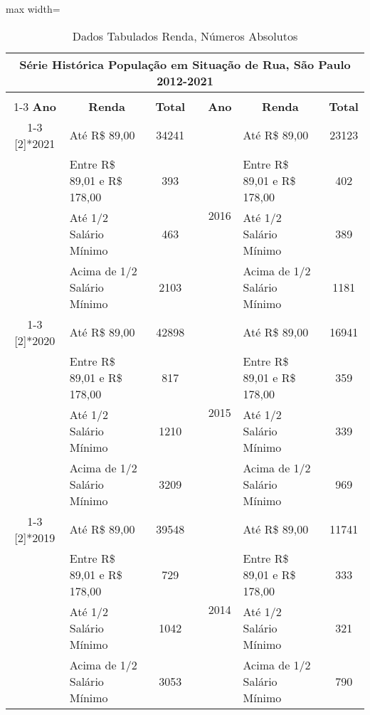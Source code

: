 \documentclass[14pt]{extarticle}
\begin{document}
\begin{table}[htbp]
  \centering
  \caption{Dados Tabulados Renda, Números Absolutos}
  \tabcolsep=0.15cm
	\renewcommand{\arraystretch}{1.8}
	\begin{adjustbox}{max width=\linewidth}
    \begin{tabular}{clccclc}
    \toprule
    \multicolumn{7}{c}{Série Histórica População em Situação de Rua, São Paulo 2012-2021} \\
    \midrule
         &      &      &      &      &      &  \\
\cmidrule{1-3}\cmidrule{5-7}    \rowcolor[rgb]{ .906,  .902,  .902} \textbf{Ano} & \multicolumn{1}{c}{\textbf{Renda}} & \multicolumn{1}{c}{\textbf{Total}} & \cellcolor[rgb]{ 1,  1,  1} & \textbf{Ano} & \multicolumn{1}{c}{\textbf{Renda}} & \multicolumn{1}{c}{\textbf{Total}} \\
\cmidrule{1-3}\cmidrule{5-7}    \multirow{4}[2]{*}{2021} & Até R\$ 89,00 & 34241 &      & \multirow{4}[2]{*}{2016} & Até R\$ 89,00 & 23123 \\
         & Entre R\$ 89,01 e R\$ 178,00 & 393  &      &      & Entre R\$ 89,01 e R\$ 178,00 & 402 \\
         & Até 1/2 Salário Mínimo & 463  &      &      & Até 1/2 Salário Mínimo & 389 \\
         & Acima de 1/2 Salário Mínimo & 2103 &      &      & Acima de 1/2 Salário Mínimo & 1181 \\
\cmidrule{1-3}\cmidrule{5-7}    \multirow{4}[2]{*}{2020} & Até R\$ 89,00 & 42898 &      & \multirow{4}[2]{*}{2015} & Até R\$ 89,00 & 16941 \\
         & Entre R\$ 89,01 e R\$ 178,00 & 817  &      &      & Entre R\$ 89,01 e R\$ 178,00 & 359 \\
         & Até 1/2 Salário Mínimo & 1210 &      &      & Até 1/2 Salário Mínimo & 339 \\
         & Acima de 1/2 Salário Mínimo & 3209 &      &      & Acima de 1/2 Salário Mínimo & 969 \\
\cmidrule{1-3}\cmidrule{5-7}    \multirow{4}[2]{*}{2019} & Até R\$ 89,00 & 39548 &      & \multirow{4}[2]{*}{2014} & Até R\$ 89,00 & 11741 \\
         & Entre R\$ 89,01 e R\$ 178,00 & 729  &      &      & Entre R\$ 89,01 e R\$ 178,00 & 333 \\
         & Até 1/2 Salário Mínimo & 1042 &      &      & Até 1/2 Salário Mínimo & 321 \\
         & Acima de 1/2 Salário Mínimo & 3053 &      &      & Acima de 1/2 Salário Mínimo & 790 \\

\end{tabular}
\end{adjustbox}
\end{table}
\end{document}
